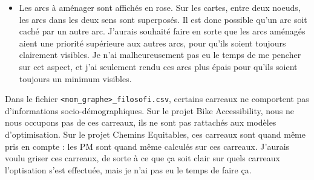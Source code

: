\begin{itemize}
    \item Les arcs à aménager sont affichés en rose. Sur les cartes, entre deux noeuds, les arcs dans les deux sens sont superposés. Il est donc possible qu'un arc soit caché par un autre arc. J'aurais souhaité faire en sorte que les arcs aménagés aient une priorité supérieure aux autres arcs, pour qu'ils soient toujours clairement visibles. Je n'ai malheureusement pas eu le temps de me pencher sur cet aspect, et j'ai seulement rendu ces arcs plus épais pour qu'ils soient toujours un minimum visibles.
\end{itemize}

Dans le fichier \verb|<nom_graphe>_filosofi.csv|, certains carreaux ne comportent pas d'informations socio-démographiques. Sur le projet Bike Accessibility, nous ne nous occupons pas de ces carreaux, ils ne sont pas rattachés aux modèles d'optimisation. Sur le projet Chemins Equitables, ces carreaux sont quand même pris en compte : les PM sont quand même calculés sur ces carreaux. J'aurais voulu griser ces carreaux, de sorte à ce que ça soit clair sur quels carreaux l'optisation s'est effectuée, mais je n'ai pas eu le temps de faire ça.